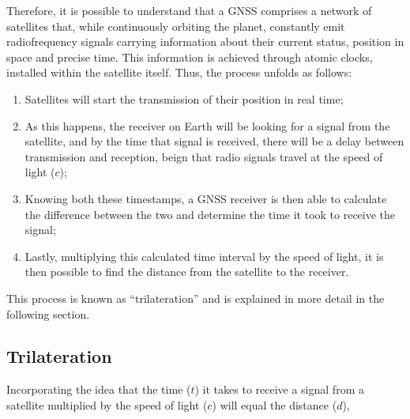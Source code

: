 Therefore, it is possible to understand that a GNSS comprises a network of satellites that, while continuously orbiting the planet, constantly emit radiofrequency signals carrying information about their current status, position in space and precise time.
This information is achieved through atomic clocks, installed within the satellite itself. Thus, the process unfolds as follows:

\begin{enumerate}
    \item Satellites will start the transmission of their position in real time;
    \item As this happens, the receiver on Earth will be looking for a signal from the satellite, and by the time that signal is received, there will be a delay between transmission and reception, beign that radio signals travel at the speed of light ($c$);
    \item Knowing both these timestamps, a GNSS receiver is then able to calculate the difference between the two and determine the time it took to receive the signal;
    \item Lastly, multiplying this calculated time interval by the speed of light, it is then possible to find the distance from the satellite to the receiver.
\end{enumerate}
This process is known as ``trilateration'' and is explained in more detail in the following section.

\subsection{Trilateration}\label{sec:II_gnss_trilateration}

Incorporating the idea that the time ($t$) it takes to receive a signal from a satellite multiplied by the speed of light ($c$) will equal the distance ($d$),

